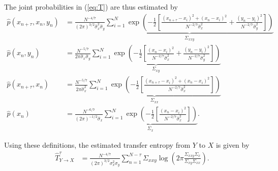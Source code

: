 \documentclass[12pt,a4paper,twoside,english,fleqn,preprint,aps,prb]{revtex4}
\begin{document}
The joint probabilities in (\ref{eq:T}) are thus estimated by
\begin{align}
  \hat{p}(x_{n+\tau}, x_n, y_n) &= \frac{N^{-4/7}}{(2\pi)^{3/2} \hat{\sigma}_x^2 \hat{\sigma}_y} \underbrace{\sum_{i=1}^N \exp \left(-\frac{1}{2} \left[
                                       \frac{(x_{n+\tau}-x_i)^2 + (x_n - x_i)^2}{N^{-2/7}\hat{\sigma}_x^2} + \frac{(y_n - y_i)^2}{N^{-2/7}\hat{\sigma}_y^2}
                                 \right] \right)}_{\Sigma_{xxy}}  \\
                                 \hat{p}(x_n, y_n) &= \frac{N^{-5/7}}{2\pi \hat{\sigma}_x \hat{\sigma}_y} \underbrace{\sum_{i=1}^N \exp \left(-\frac{1}{2} \left[
                                       \frac{(x_n - x_i)^2}{N^{-2/7}\hat{\sigma}_x^2} + \frac{(y_n - y_i)^2}{N^{-2/7}\hat{\sigma}_y^2}
                                 \right] \right)}_{\Sigma_{xy}}  \\
                                 \hat{p}(x_{n+\tau}, x_n) &= \frac{N^{-5/7}}{2\pi \hat{\sigma}_x^2} \underbrace{\sum_{i=1}^N \exp \left(-\frac{1}{2} \left[
                                       \frac{(x_{n+\tau} - x_i)^2 + (x_n - x_i)^2}{N^{-2/7}\hat{\sigma}_x^2}
                                 \right] \right) }_{\Sigma_{xx}} \\
                                   \hat{p}(x_n) &= \frac{N^{-6/7}}{(2\pi)^{-1/2} \hat{\sigma}_x} \underbrace{\sum_{i=1}^N \exp \left(-\frac{1}{2} \left[
                                       \frac{(x_n - x_i)^2}{N^{-2/7}\hat{\sigma}_x^2}
                                 \right] \right)}_{\Sigma_{x}}.
\end{align}

Using these definitions, the estimated transfer entropy from $Y$ to $X$ is given by
\begin{align}
  \hat{T}_{Y \rightarrow X}^{\tau} &= \frac{N^{-4/7}}{(2\pi)^{3/2}\sigma_x^2 \sigma_y}
                                        \sum_{n=1}^{N-\tau} \Sigma_{xxy} \log\left(2\pi \frac{\Sigma_{xxy} \Sigma_{x}}{\Sigma_{xy} \Sigma_{xx}} \right).
\end{align}



\end{document}
